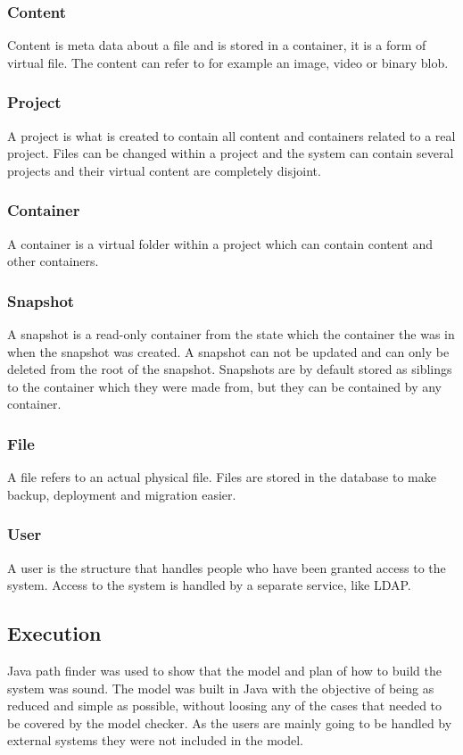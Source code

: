 \documentclass[a4paper,12pt]{article}
\begin{document}
\subsubsection{Content}
Content is meta data about a file and is stored in a container, it is a form of virtual file.  The
content can refer to for example an image, video or binary blob.

\subsubsection{Project}
A project is what is created to contain all content and containers related to a real project. Files
can be changed within a project and the system can contain several projects and their virtual
content are completely disjoint.

\subsubsection{Container}
A container is a virtual folder within a project which can contain content and other containers.

\subsubsection{Snapshot}
A snapshot is a read-only container from the state which the container the was in when the snapshot
was created.  A snapshot can not be updated and can only be deleted from the root of the snapshot.
Snapshots are by default stored as siblings to the container which they were made from, but they can
be contained by any container.

\subsubsection{File}
A file refers to an actual physical file. Files are stored in the database to make backup,
deployment and migration easier.

\subsubsection{User}
A user is the structure that handles people who have been granted access to the system. Access to
the system is handled by a separate service, like LDAP.

\subsection{Execution}
Java path finder was used to show that the model and plan of how to build the system was sound. The
model was built in Java with the objective of being as reduced and simple as possible, without
loosing any of the cases that needed to be covered by the model checker. As the users are mainly
going to be handled by external systems they were not included in the model.
\end{document}
